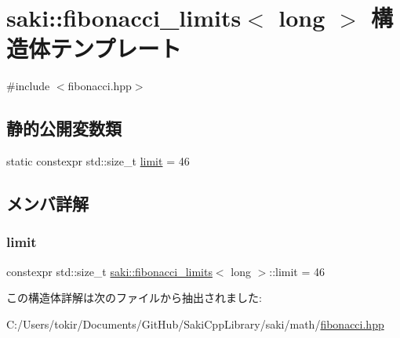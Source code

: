 \hypertarget{structsaki_1_1fibonacci__limits_3_01long_01_4}{}\section{saki\+:\+:fibonacci\+\_\+limits$<$ long $>$ 構造体テンプレート}
\label{structsaki_1_1fibonacci__limits_3_01long_01_4}


{\ttfamily \#include $<$fibonacci.\+hpp$>$}

\subsection*{静的公開変数類}
\begin{DoxyCompactItemize}
\item 
static constexpr std\+::size\+\_\+t \mbox{\hyperlink{structsaki_1_1fibonacci__limits_3_01long_01_4_a134a40f7a46cfc129ae9570fb95f267d}{limit}} = 46
\end{DoxyCompactItemize}


\subsection{メンバ詳解}
\mbox{\label{structsaki_1_1fibonacci__limits_3_01long_01_4_a134a40f7a46cfc129ae9570fb95f267d}} 
\subsubsection{\texorpdfstring{limit}{limit}}
{\footnotesize\ttfamily constexpr std\+::size\+\_\+t \mbox{\hyperlink{structsaki_1_1fibonacci__limits}{saki\+::fibonacci\+\_\+limits}}$<$ long $>$\+::limit = 46\hspace{0.3cm}{\ttfamily [static]}}



この構造体詳解は次のファイルから抽出されました\+:\begin{DoxyCompactItemize}
\item 
C\+:/\+Users/tokir/\+Documents/\+Git\+Hub/\+Saki\+Cpp\+Library/saki/math/\mbox{\hyperlink{fibonacci_8hpp}{fibonacci.\+hpp}}\end{DoxyCompactItemize}
